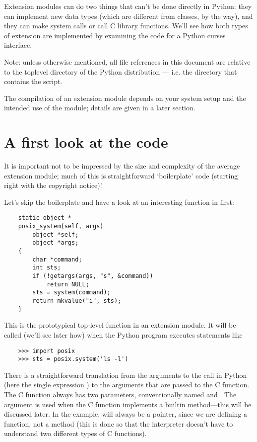 Extension modules can do two things that can't be done directly in
Python: they can implement new data types (which are different from
classes, by the way), and they can make system calls or call C library
functions.   We'll see how both types of extension are implemented by
examining the code for a Python curses interface.

Note: unless otherwise mentioned, all file references in this
document are relative to the toplevel directory of the Python
distribution --- i.e. the directory that contains the 
script.

The compilation of an extension module depends on your system setup
and the intended use of the module; details are given in a later
section.


\section{A first look at the code}

It is important not to be impressed by the size and complexity of
the average extension module; much of this is straightforward
`boilerplate' code (starting right with the copyright notice)!

Let's skip the boilerplate and have a look at an interesting function
in  first:

\begin{verbatim}
    static object *
    posix_system(self, args)
        object *self;
        object *args;
    {
        char *command;
        int sts;
        if (!getargs(args, "s", &command))
            return NULL;
        sts = system(command);
        return mkvalue("i", sts);
    }
\end{verbatim}

This is the prototypical top-level function in an extension module.
It will be called (we'll see later how) when the Python program
executes statements like

\begin{verbatim}
    >>> import posix
    >>> sts = posix.system('ls -l')
\end{verbatim}

There is a straightforward translation from the arguments to the call
in Python (here the single expression ) to the arguments that
are passed to the C function.  The C function always has two
parameters, conventionally named  and .  The
 argument is used when the C function implements a builtin
method---this will be discussed later.
In the example,  will always be a  pointer, since
we are defining a function, not a method (this is done so that the
interpreter doesn't have to understand two different types of C
functions).

